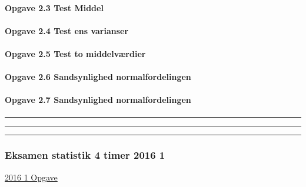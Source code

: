 \documentclass[]{book}
\let\oldparagraph\paragraph
\renewcommand{\paragraph}[1]{\oldparagraph{#1}\mbox{}}
\begin{document}
\hypertarget{opgave-2.3-test-middel}{%
\paragraph{Opgave 2.3 Test Middel}\label{opgave-2.3-test-middel}}

\hypertarget{opgave-2.4-test-ens-varianser}{%
\paragraph{Opgave 2.4 Test ens varianser}\label{opgave-2.4-test-ens-varianser}}

\hypertarget{opgave-2.5-test-to-middelvrdier}{%
\paragraph{Opgave 2.5 Test to middelværdier}\label{opgave-2.5-test-to-middelvrdier}}

\hypertarget{opgave-2.6-sandsynlighed-normalfordelingen}{%
\paragraph{Opgave 2.6 Sandsynlighed normalfordelingen}\label{opgave-2.6-sandsynlighed-normalfordelingen}}

\hypertarget{opgave-2.7-sandsynlighed-normalfordelingen}{%
\paragraph{Opgave 2.7 Sandsynlighed normalfordelingen}\label{opgave-2.7-sandsynlighed-normalfordelingen}}

\begin{center}\rule{0.5\linewidth}{\linethickness}\end{center}

\begin{center}\rule{0.5\linewidth}{\linethickness}\end{center}

\begin{center}\rule{0.5\linewidth}{\linethickness}\end{center}

\hypertarget{eksamen-statistik-4-timer-2016-1}{%
\subsubsection{Eksamen statistik 4 timer 2016 1}\label{eksamen-statistik-4-timer-2016-1}}

\href{https://www.dropbox.com/s/t1h9o0xnutneavu/AU\%20Statistik\%20eksamensopgave\%20-\%20januar\%202016.pdf?dl=1}{2016 1 Opgave}
\end{document}
